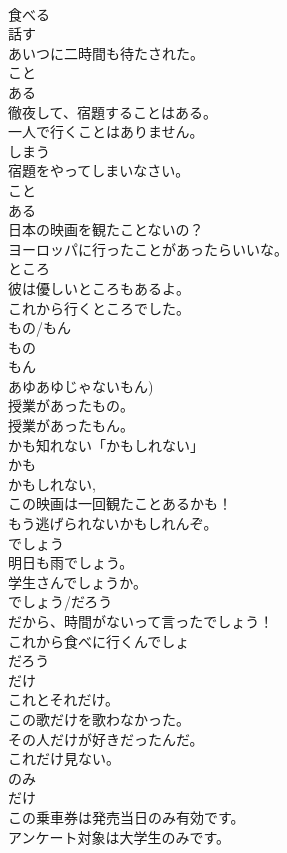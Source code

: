 \documentclass[8pt]{extreport}
\begin{document}
\begin{CJK}{UTF8}{min}
\\	食べる 
\\	話す
\\	あいつに二時間も待たされた。
\\	こと 
\\	ある	
\\	徹夜して、宿題することはある。
\\	一人で行くことはありません。
\\	しまう 
\\	宿題をやってしまいなさい。
\\	こと 
\\	ある	
\\	日本の映画を観たことないの？
\\	ヨーロッパに行ったことがあったらいいな。 
\\	ところ	
\\	彼は優しいところもあるよ。
\\	これから行くところでした。
\\	もの/もん	
\\	もの 
\\	もん 
\\	あゆあゆじゃないもん) 
\\	授業があったもの。
\\	授業があったもん。 
\\	かも知れない「かもしれない」	
\\	かも	
\\	かもしれない, 
\\	この映画は一回観たことあるかも！
\\	もう逃げられないかもしれんぞ。
\\	でしょう	
\\	明日も雨でしょう。 
\\	学生さんでしょうか。
\\	でしょう/だろう
\\	だから、時間がないって言ったでしょう！
\\	これから食べに行くんでしょ
\\	だろう 
\\	だけ	
\\	これとそれだけ。
\\	この歌だけを歌わなかった。
\\	その人だけが好きだったんだ。
\\	これだけ見ない。
\\	のみ	
\\	だけ
\\	この乗車券は発売当日のみ有効です。 
\\	アンケート対象は大学生のみです。 

\end{CJK}
\end{document}
